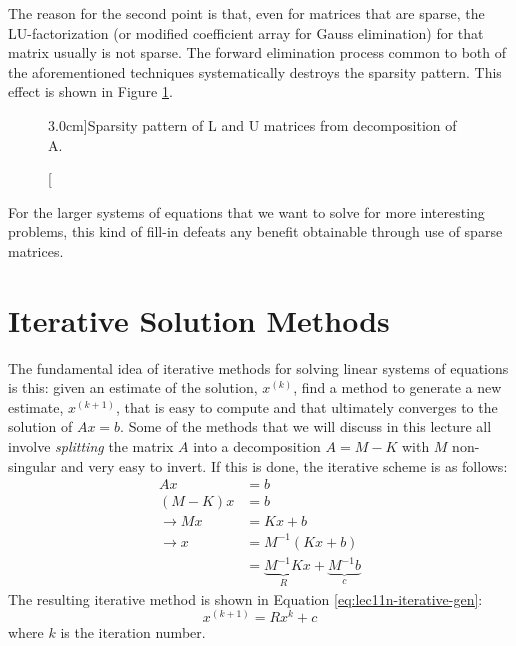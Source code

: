 The reason for the second point is that, even for matrices that are sparse, the LU-factorization (or modified coefficient array for Gauss elimination) for that matrix usually is not sparse.  The forward elimination process common to both of the aforementioned techniques systematically destroys the sparsity pattern.  This effect is shown in Figure \ref{fig:lec11n-LandU}.
\begin{figure}[h!]
\label{fig:lec11n-LandU}
\caption[][3.0cm]{Sparsity pattern of L and U matrices from decomposition of A.}
\end{figure}

\noindent For the larger systems of equations that we want to solve for more interesting problems, this kind of fill-in defeats any benefit obtainable through use of sparse matrices.

\section{Iterative Solution Methods}

The fundamental idea of iterative methods for solving linear systems of equations is this: given an estimate of the solution, $x^{(k)}$, find a method to generate a new estimate, $x^{(k+1)}$, that is easy to compute and that ultimately converges to the solution of $Ax=b$.  Some of the methods that we will discuss in this lecture all involve \emph{splitting} the matrix $A$ into a decomposition $A=M-K$ with $M$ non-singular and very easy to invert.  If this is done, the iterative scheme is as follows:
\begin{align*}
Ax &= b \\
(M-K)x &= b \\
\rightarrow Mx &= Kx + b \\
\rightarrow x &= M^{-1}(Kx + b) \\
&= \underbrace{M^{-1}K}_{R}x + \underbrace{M^{-1}b}_{c}
\end{align*} 
The resulting iterative method is shown in Equation \ref{eq:lec11n-iterative-gen}:
\begin{equation}
x^{(k+1)} = Rx^{k} + c
\label{eq:lec11n-iterative-gen}
\end{equation}
where $k$ is the iteration number.

